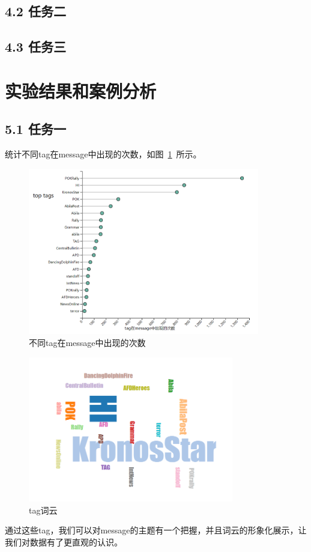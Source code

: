 \documentclass[a4paper]{article}
\begin{document}
\subsection*{ 4.2 任务二}
\subsection*{ 4.3 任务三}

\section{实验结果和案例分析}\label{sub:ptxeva}
\subsection*{ 5.1 任务一}

统计不同tag在message中出现的次数，如图~\ref{fig:1-tags}~所示。

\begin{figure}[H]
  \centering
  \includegraphics[width=0.9\textwidth]{images/1-tags.png}
  \caption{不同tag在message中出现的次数}\label{fig:1-tags}
  \vspace{\baselineskip}
\end{figure}
\begin{figure}[H]
  \centering
  \includegraphics[width=0.8\textwidth]{images/1-wordcloud.png}
  \caption{tag词云}\label{fig:1-wordcloud}
  \vspace{\baselineskip}
\end{figure}
通过这些tag，我们可以对message的主题有一个把握，并且词云的形象化展示，让我们对数据有了更直观的认识。
\end{document}
